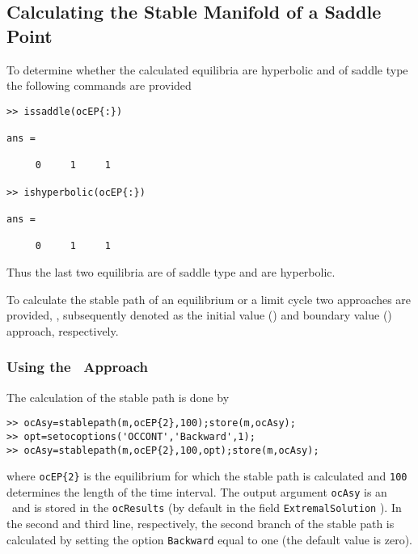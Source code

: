 \subsection{Calculating the Stable Manifold of a Saddle Point}

To determine whether the calculated equilibria are hyperbolic and of saddle type the following commands are provided
\begin{lstlisting}
>> issaddle(ocEP{:})

ans =

     0     1     1

>> ishyperbolic(ocEP{:})

ans =

     0     1     1

\end{lstlisting}
Thus the last two equilibria are of saddle type and are hyperbolic. 

To calculate the stable path of an equilibrium or a limit cycle two approaches are provided, \citep[cf.,][]{grassetal2008}, subsequently denoted as the initial value (\IVP) and boundary value (\BVP) approach, respectively. 

\subsubsection{Using the \IVP\ Approach}
The calculation of the stable path is done by
\begin{lstlisting}
>> ocAsy=stablepath(m,ocEP{2},100);store(m,ocAsy);
>> opt=setocoptions('OCCONT','Backward',1);
>> ocAsy=stablepath(m,ocEP{2},100,opt);store(m,ocAsy);
\end{lstlisting}
where \lstinline+ocEP{2}+ is the equilibrium for which the stable path is calculated and \lstinline+100+ determines the length of the time interval. The output argument \lstinline+ocAsy+ is an \ocasymptotic\ and is stored in the \lstinline+ocResults+ (by default in the field \lstinline+ExtremalSolution+ ). In the second and third line, respectively, the second branch of the stable path is calculated by setting the option \lstinline+Backward+ equal to one (the default value is zero).

